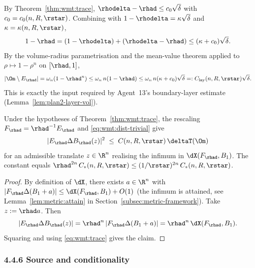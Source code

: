 \begin{remark}
\label{rem:wmt:layer-volume}
By Theorem~\ref{thm:wmt:trace},
$\rhodelta-\rhad\le c_0\sqrt{\delta}$ with $c_0=c_0(n,R,\rstar)$.
Combining with $1-\rhodelta=\kappa\sqrt{\delta}$ and
$\kappa=\kappa(n,R,\rstar)$,
\[
   1-\rhad=(1-\rhodelta)+(\rhodelta-\rhad)
   \le (\kappa+c_0)\sqrt{\delta}.
\]
By the volume-radius parametrisation and the mean-value theorem applied
to $\rho\mapsto 1-\rho^n$ on $[\rhad,1]$,
\[
   |\Om\setminus E_\rhad|
   =\omega_n(1-\rhad^n)
   \le \omega_n\,n(1-\rhad)
   \le \omega_n\,n(\kappa+c_0)\sqrt{\delta}
   =:C_{\mathrm{lay}}(n,R,\rstar)\sqrt{\delta}.
\]
This is exactly the input required by Agent~13's boundary-layer
estimate (Lemma~\ref{lem:plan2-layer-vol}).
\end{remark}

\begin{corollary}
\label{cor:wmt:pointwise-asym}
Under the hypotheses of Theorem~\ref{thm:wmt:trace}, the rescaling
$F_\rhad=\rhad^{-1}E_\rhad$ and \eqref{eq:wmt:dist-trivial} give
\[
   |E_\rhad\Delta B_\rhad(z)|^2
   \;\le\; C(n,R,\rstar)\,\deltaT(\Om)
\]
for an admissible translate $z\in\R^n$ realising the infimum in
$\dX(F_\rhad,B_1)$. The constant equals
$\rhad^{2n}\,C_*(n,R,\rstar)\le
(1/\rstar)^{2n}\,C_*(n,R,\rstar)$.
\end{corollary}

\begin{proof}
By definition of $\dX$, there exists $a\in\R^n$ with
$|F_\rhad\Delta(B_1+a)|\le\dX(F_\rhad,B_1)+O(1)$ (the infimum is
attained, see Lemma~\ref{lem:metric:attain} in
Section~\ref{subsec:metric-framework}). Take $z:=\rhad a$. Then
\[
   |E_\rhad\Delta B_\rhad(z)|
   =\rhad^n\,|F_\rhad\Delta(B_1+a)|
   =\rhad^n\,\dX(F_\rhad,B_1).
\]
Squaring and using \eqref{eq:wmt:trace} gives the claim.
\end{proof}

\subsubsection{4.4.6 Source and conditionality}
\label{subsec:wmt:source-conditional}

